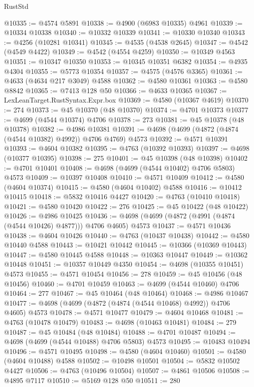 \begin{lexlean}{RustStd}
\begin{coremodule}
@10335 := @4574 @5891
@10338 := @4900 (@6983 @10335) @4961
@10339 := @10334 @10338
@10340 := @10332 @10339
@10341 := @10330 @10340
@10343 := @4256 (@10281 @10341)
@10345 := @4535 (@4538 @2645)
@10347 := @4542 (@4549 @4422)
@10349 := @4542 (@4554 @4259)
@10350 := @10349 @4563
@10351 := @10347 @10350
@10353 := @10345 @10351 @6382
@10354 := @4935 @4304
@10355 := @5773 @10354
@10357 := @4575 (@4576 @3365)
@10361 := @4633 (@4634 @217 @3049) @4588
@10362 := @4580 @10361
@10363 := @4580 @8842
@10365 := @7413 @128 @50
@10366 := @4633 @10365
@10367 := LexLeanTarget.RustSyntax.Expr.box
@10369 := @4580 (@10367 @4619)
@10370 := 274
@10373 := @45 @10370 (@48 @10370)
@10374 := @4701 @10373
@10377 := @4699 (@4544 @10374) @4706
@10378 := 273
@10381 := @45 @10378 (@48 @10378)
@10382 := @4986 @10381
@10391 := @4698 (@4699 (@4872 (@4874 (@4544 @10382) @4992)) @4706 @4769) @4573
@10392 := @4571 @10391
@10393 := @4604 @10382
@10395 := @4763 (@10392 @10393)
@10397 := @4698 (@10377 @10395)
@10398 := 275
@10401 := @45 @10398 (@48 @10398)
@10402 := @4701 @10401
@10408 := @4698 (@4699 (@4544 @10402) @4706 @5803) @4573
@10409 := @10397 @10408
@10410 := @4571 @10409
@10412 := @4580 (@4604 @10374)
@10415 := @4580 (@4604 @10402) @4588
@10416 := @10412 @10415
@10418 := @5832 @10416 @4427
@10420 := @4763 (@10410 @10418)
@10421 := @4580 @10420
@10422 := 276
@10425 := @45 @10422 (@48 @10422)
@10426 := @4986 @10425
@10436 := @4698 (@4699 (@4872 (@4991 (@4874 (@4544 @10426) @4877))) @4706 @4605) @4573
@10437 := @4571 @10436
@10438 := @4604 @10426
@10440 := @4763 (@10437 @10438)
@10442 := @4580 @10440 @4588
@10443 := @10421 @10442
@10445 := @10366 (@10369 @10443)
@10447 := @4580 @10445 @4588
@10448 := @10363 @10447
@10449 := @10362 @10448
@10451 := @10357 @10449 @4350
@10454 := @4698 (@10355 @10451) @4573
@10455 := @4571 @10454
@10456 := 278
@10459 := @45 @10456 (@48 @10456)
@10460 := @4701 @10459
@10463 := @4699 (@4544 @10460) @4706
@10464 := 277
@10467 := @45 @10464 (@48 @10464)
@10468 := @4986 @10467
@10477 := @4698 (@4699 (@4872 (@4874 (@4544 @10468) @4992)) @4706 @4605) @4573
@10478 := @4571 @10477
@10479 := @4604 @10468
@10481 := @4763 (@10478 @10479)
@10483 := @4698 (@10463 @10481)
@10484 := 279
@10487 := @45 @10484 (@48 @10484)
@10488 := @4701 @10487
@10494 := @4698 (@4699 (@4544 @10488) @4706 @5803) @4573
@10495 := @10483 @10494
@10496 := @4571 @10495
@10498 := @4580 (@4604 @10460)
@10501 := @4580 (@4604 @10488) @4588
@10502 := @10498 @10501
@10504 := @5832 @10502 @4427
@10506 := @4763 (@10496 @10504)
@10507 := @4861 @10506
@10508 := @4895 @7117
@10510 := @5169 @128 @50
@10511 := 280

\end{coremodule}
\end{lexlean}
